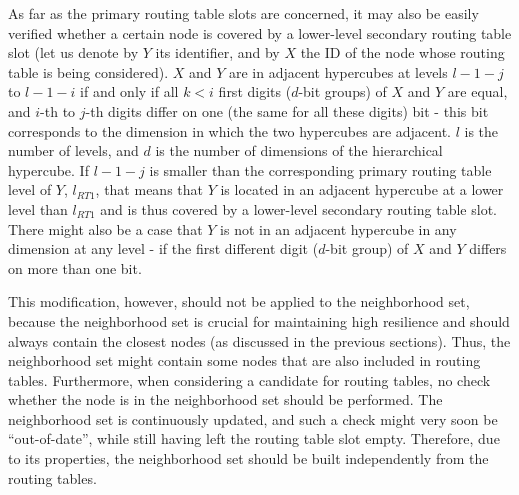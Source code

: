 As far as the primary routing table slots are concerned, it may also be easily verified whether a certain node is covered by a lower-level secondary routing table slot (let us denote by $Y$ its identifier, and by $X$ the ID of the node whose routing table is being considered). $X$ and $Y$ are in adjacent hypercubes at levels $l - 1 - j$ to $l - 1 - i$ if and only if all $k<i$ first digits ($d$-bit groups) of $X$ and $Y$ are equal, and $i$-th to $j$-th digits differ on one (the same for all these digits) bit - this bit corresponds to the dimension in which the two hypercubes are adjacent. $l$ is the number of levels, and $d$ is the number of dimensions of the hierarchical hypercube. If $l - 1 - j$ is smaller than the corresponding primary routing table level of $Y$, $l_{RT1}$, that means that $Y$ is located in an adjacent hypercube at a lower level than $l_{RT1}$ and is thus covered by a lower-level secondary routing table slot. There might also be a case that $Y$ is not in an adjacent hypercube in any dimension at any level - if the first different digit ($d$-bit group) of $X$ and $Y$ differs on more than one bit.

This modification, however, should not be applied to the neighborhood set, because the neighborhood set is crucial for maintaining high resilience and should always contain the closest nodes (as discussed in the previous sections). Thus, the neighborhood set might contain some nodes that are also included in routing tables. Furthermore, when considering a candidate for routing tables, no check whether the node is in the neighborhood set should be performed. The neighborhood set is continuously updated, and such a check might very soon be ``out-of-date'', while still having left the routing table slot empty. Therefore, due to its properties, the neighborhood set should be built independently from the routing tables.











